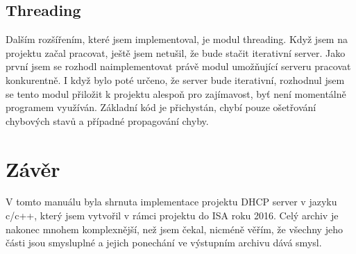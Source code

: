 \documentclass[12pt,a4paper]{report}
\begin{document}
\section{Threading}
Dalším rozšířením, které jsem implementoval, je modul threading. Když jsem na projektu začal pracovat, ještě jsem netušil, že bude stačit iterativní server. Jako první jsem se rozhodl naimplementovat právě modul umožňující serveru pracovat konkurentně. I když bylo poté určeno, že server bude iterativní, rozhodnul jsem se tento modul přiložit k projektu alespoň pro zajímavost, byť není momentálně programem využíván. Základní kód je přichystán, chybí pouze ošetřování chybových stavů a případné propagování chyby. 
\chapter{Závěr}
V tomto manuálu byla shrnuta implementace projektu DHCP server v jazyku c/c++, který jsem vytvořil v rámci projektu do ISA roku 2016. Celý archiv je nakonec mnohem komplexnější, než jsem čekal, nicméně věřím, že všechny jeho části jsou smysluplné a jejich ponechání ve výstupním archivu dává smysl.
\end{document}
